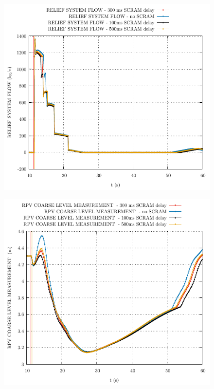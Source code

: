 \documentclass{article}
\begin{document}
\begin{multicols}{2}
\begin{figure}[H]
\end{figure}
\begin{figure}[H]
\centering
\includegraphics[width=\columnwidth]{./graphs/RELIEF SYSTEM FLOW_comp.pdf}
\end{figure}
\begin{figure}[H]
\centering
\includegraphics[width=\columnwidth]{./graphs/RPV COARSE LEVEL MEASUREMENT _comp.pdf}

\end{figure}
\end{multicols}
\end{document}

